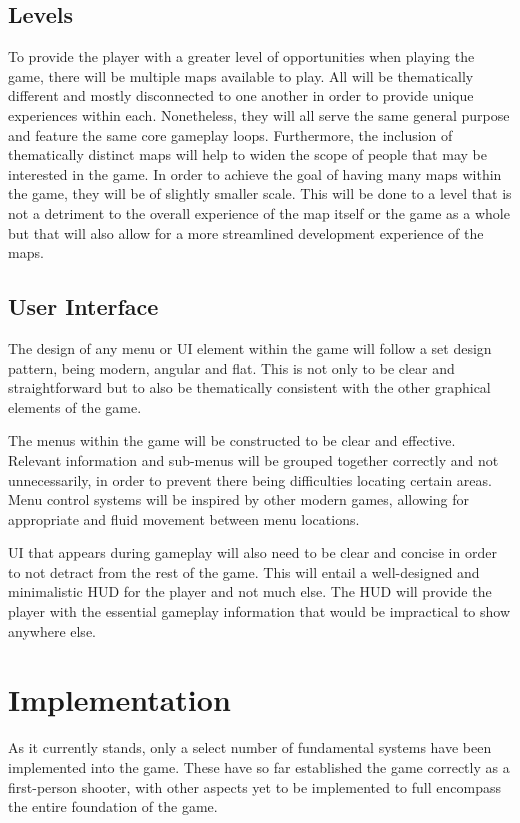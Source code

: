 \documentclass[11pt]{article}
\begin{document}
\subsection{Levels}
To provide the player with a greater level of opportunities when playing the game, there will be
multiple maps available to play. All will be thematically different and mostly disconnected to one
another in order to provide unique experiences within each. Nonetheless, they will all serve the
same general purpose and feature the same core gameplay loops. Furthermore, the inclusion of
thematically distinct maps will help to widen the scope of people that may be interested in the
game. In order to achieve the goal of having many maps within the game, they will be of slightly
smaller scale. This will be done to a level that is not a detriment to the overall experience of
the map itself or the game as a whole but that will also allow for a more streamlined development
experience of the maps. \\

\subsection{User Interface}
The design of any menu or UI element within the game will follow a set design pattern,
being modern, angular and flat. This is not only to be clear and straightforward but to also be
thematically consistent with the other graphical elements of the game.

The menus within the game will be constructed to be clear and effective. Relevant information and
sub-menus will be grouped together correctly and not unnecessarily, in order to prevent there being
difficulties locating certain areas. Menu control systems will be inspired by other modern games,
allowing for appropriate and fluid movement between menu locations. 

UI that appears during gameplay will also need to be clear and concise in order to not detract from
the rest of the game. This will entail a well-designed and minimalistic HUD for the player and not
much else. The HUD will provide the player with the essential gameplay information that would be
impractical to show anywhere else. \\

\section{Implementation}
As it currently stands, only a select number of fundamental systems have been implemented into the
game. These have so far established the game correctly as a first-person shooter, with other
aspects yet to be implemented to full encompass the entire foundation of the game. \\
\end{document}
